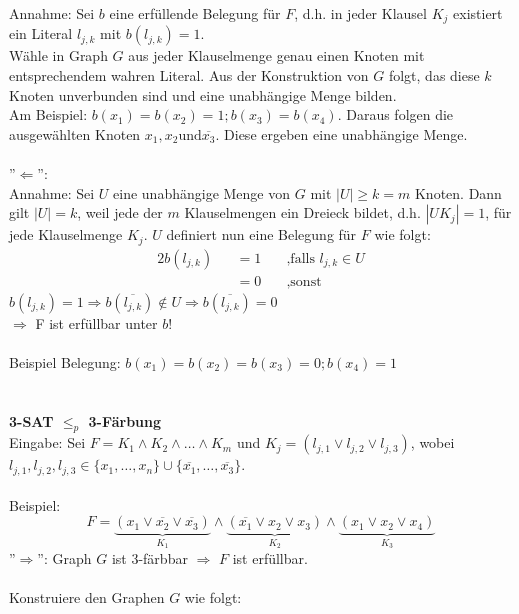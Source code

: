 \documentclass{article} %
\begin{document}
Annahme: Sei $b$ eine erfüllende Belegung für $F$, d.h. in jeder Klausel $K_j$ existiert ein Literal $l_{j,k}$ mit $b(l_{j,k}) = 1$.\\
Wähle in Graph $G$ aus jeder Klauselmenge genau einen Knoten mit entsprechendem wahren Literal. Aus der Konstruktion von $G$ folgt, das diese $k$ Knoten unverbunden sind und eine unabhängige Menge bilden.\\
Am Beispiel: $b(x_1) = b(x_2) = 1; b(x_3) = b(x_4)$. Daraus folgen die ausgewählten Knoten $x_1, x_2 \text{und} \overline{x_3}$. Diese ergeben eine unabhängige Menge.\\
\\
''$\Leftarrow$'':\\
Annahme: Sei $U$ eine unabhängige Menge von $G$ mit $|U| \geq k = m$ Knoten. Dann gilt $|U| = k$, weil jede der $m$ Klauselmengen ein Dreieck bildet, d.h. $|U  K_j| = 1$, für jede Klauselmenge $K_j$. $U$ definiert nun eine Belegung für $F$ wie folgt:
\begin{alignat*}{2}
b(l_{j,k}) &&= 1	&\quad\text{,falls } l_{j,k} \in U\\
			&&=0	&\quad\text{,sonst}
\end{alignat*}
$b(l_{j,k}) = 1 \Rightarrow b(\overline{l_{j,k}}) \notin U \Rightarrow b(\overline{l_{j,k}}) = 0$\\
$\Rightarrow$ F ist erfüllbar unter $b$!\\
\\
Beispiel Belegung: $b(x_1) = b(x_2) = b(x_3) = 0; b(x_4) = 1$\\
\\
\\
\textbf{3-SAT $\leq_p$ 3-Färbung}\\
Eingabe: Sei $F = K_1 \wedge K_2 \wedge \ldots \wedge K_m$ und $K_j = (l_{j,1} \vee l_{j,2} \vee l_{j,3})$, wobei
$l_{j,1}, l_{j,2}, l_{j,3} \in \{x_1, \ldots, x_n\} \cup \{\overline{x_1}, \ldots, \overline{x_3}\}$.\\
\\
Beispiel: \[F = \underbrace{(x_1 \vee \overline{x_2} \vee \overline{x_3})}_{K_1} \wedge \underbrace{(\overline{x_1} \vee x_2 \vee x_3)}_{K_2} \wedge \underbrace{(x_1 \vee x_2 \vee x_4)}_{K_3}\]
''$\Rightarrow$'': Graph $G$ ist 3-färbbar $\Rightarrow$ $F$ ist erfüllbar.\\
\\
Konstruiere den Graphen $G$ wie folgt:
\end{document}

